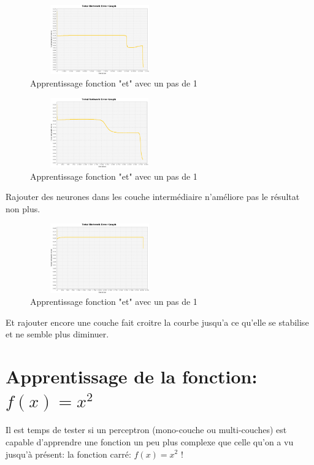 \documentclass[twoside,openright,a4paper,11pt,french]{article}
\begin{document}
\begin{figure}[h]
\includegraphics[width=6cm,height=3cm]{./pics/eq/multi_6_6_def.eps}
\caption{Apprentissage fonction "et" avec un pas de 1}
\label{fig:anderr4}
\end{figure}

\begin{figure}[h]
\includegraphics[width=6cm,height=3cm]{./pics/eq/multi_3_4_def.eps}
\caption{Apprentissage fonction "et" avec un pas de 1}
\label{fig:anderr4}
\end{figure}


Rajouter des neurones dans les couche intermédiaire n'améliore pas le résultat non plus.

\begin{figure}[h]
\centering
\includegraphics[width=6cm,height=3cm]{./pics/eq/multi_3_3_3_def.eps}
\caption{Apprentissage fonction "et" avec un pas de 1}
\label{fig:anderr4}
\end{figure}


Et rajouter encore une couche fait croitre la courbe jusqu'a ce qu'elle se
stabilise et ne semble plus diminuer.


\section{Apprentissage de la fonction: $f(x) = x^2$}

Il est temps de tester si un perceptron (mono-couche ou multi-couches) est
capable d'apprendre une fonction un peu plus complexe que celle qu'on a vu jusqu'à présent: 
la fonction carré: $f(x) = x^2$ !\\
\end{document}

